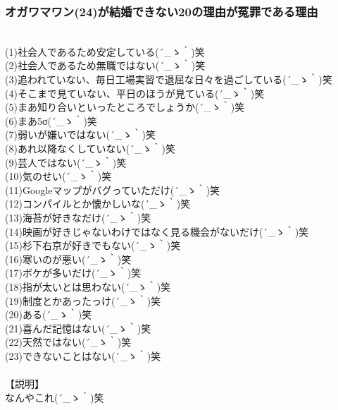 \documentclass[12pt]{jsarticle}
\begin{document}
\subsubsection{オガワマワン(24)が結婚できない20の理由が冤罪である理由}
　\\
(1)社会人であるため安定している{\sf (´\_ゝ｀)}笑\\
(2)社会人であるため無職ではない{\sf (´\_ゝ｀)}笑\\
(3)追われていない、毎日工場実習で退屈な日々を過ごしている{\sf (´\_ゝ｀)}笑\\
(4)そこまで見ていない、平日のほうが見ている{\sf (´\_ゝ｀)}笑\\
(5)まあ知り合いといったところでしょうか{\sf (´\_ゝ｀)}笑\\
(6)まあ5σ{\sf (´\_ゝ｀)}笑\\
(7)弱いが嫌いではない{\sf (´\_ゝ｀)}笑\\
(8)あれ以降なくしていない{\sf (´\_ゝ｀)}笑\\
(9)芸人ではない{\sf (´\_ゝ｀)}笑\\
(10)気のせい{\sf (´\_ゝ｀)}笑\\
(11)Googleマップがバグっていただけ{\sf (´\_ゝ｀)}笑\\
(12)コンパイルとか懐かしいな{\sf (´\_ゝ｀)}笑\\
(13)海苔が好きなだけ{\sf (´\_ゝ｀)}笑\\
(14)映画が好きじゃないわけではなく見る機会がないだけ{\sf (´\_ゝ｀)}笑\\
(15)杉下右京が好きでもない{\sf (´\_ゝ｀)}笑\\
(16)寒いのが悪い{\sf (´\_ゝ｀)}笑\\
(17)ボケが多いだけ{\sf (´\_ゝ｀)}笑\\
(18)指が太いとは思わない{\sf (´\_ゝ｀)}笑\\
(19)制度とかあったっけ{\sf (´\_ゝ｀)}笑\\
(20)ある{\sf (´\_ゝ｀)}笑\\
(21)喜んだ記憶はない{\sf (´\_ゝ｀)}笑\\
(22)天然ではない{\sf (´\_ゝ｀)}笑\\
(23)できないことはない{\sf (´\_ゝ｀)}笑\\
\\
【説明】\\
なんやこれ{\sf (´\_ゝ｀)}笑\\


\newpage
\end{document}
